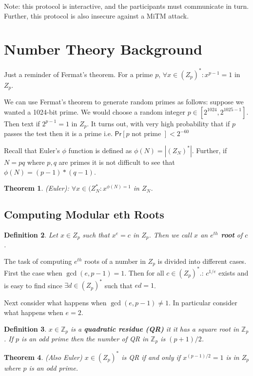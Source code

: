 \documentclass[twoside]{article}
\newcounter{lecnum}
\newtheorem{theorem}{Theorem}[lecnum]
\newtheorem{definition}[theorem]{Definition}
\def\Pr{\mathsf{Pr}}
\def\Z{\mathbb{Z}}
\begin{document}
Note: this protocol is interactive, and the participants must communicate in turn. Further, this protocol is also insecure against a MiTM attack.

\section{Number Theory Background}
Just a reminder of Fermat's theorem. For a prime $p$, $\forall x \in (Z_p)^*: x^{p-1} = 1$ in $Z_p$.

We can use Fermat's theorem to generate random primes as follows: suppose we wanted a 1024-bit prime. We would choose a random integer $p \in [2^{1024}, 2^{1025-1}]$. Then text if $2^{p-1} = 1$ in $Z_p$. It turns out, with very high probability that if $p$ passes the test then it is a prime i.e. $\Pr [p \mbox{ not prime }] < 2^{-60}$

Recall that Euler's $\phi$ function is defined as $\phi(N) = |(Z_N)^*|$. Further, if $N = pq$ where $p,q$ are primes it is not difficult to see that $\phi(N) = (p-1)*(q-1)$. 

\begin{theorem}
(Euler): $\forall x\in (Z_N^*: x^{\phi(N) = 1}$ in $Z_N$. 
\end{theorem} 

\subsection{Computing Modular eth Roots}
\begin{definition}
Let $x \in Z_p$ such that $x^e = c$ in $Z_p$. Then we call $x$ an \textbf{$e^{th}$ root} of $c$.
\end{definition}

The task of computing $e^{th}$ roots of a number in $Z_p$ is divided into different cases. First the case when $\gcd (e, p-1) = 1$. Then for all $c \in (Z_p)^*$.: $c^{1/e}$ exists and is easy to find since $\exists d \in (Z_p)^*$ such that $ed = 1$. 

Next consider what happens when $\gcd(e, p-1) \neq 1$. In particular consider what happens when $e = 2$.

\begin{definition}
$x \in \Z_p$ is a \textbf{quadratic residue (QR)} it it has a square root in $\Z_p$. If $p$ is an odd prime then the number of QR in $\Z_p$ is $(p+1)/2$.
\end{definition}

\begin{theorem}
(Also Euler) $x \in (Z_p)^*$ is QR if and only if $x^{(p-1)/2} = 1$ is in $Z_p$ where $p$ is an odd prime.
\end{theorem}
\end{document}

